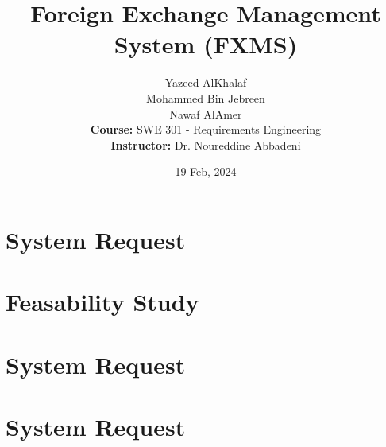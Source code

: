 \documentclass[a4paper]{report}
\title{Foreign Exchange Management System (FXMS)}
\author{
    Yazeed AlKhalaf \\
    Mohammed Bin Jebreen \\
    Nawaf AlAmer \\
    \textbf{Course:} SWE 301 - Requirements Engineering \\
    \textbf{Instructor:} Dr. Noureddine Abbadeni
}
\date{19 Feb, 2024}
\begin{document}
\maketitle

\newpage

\section{System Request}

\subsection{}

\section{Feasability Study}

\section{System Request}

\section{System Request}
\end{document}
